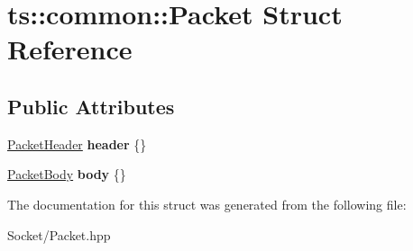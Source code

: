 \hypertarget{structts_1_1common_1_1_packet}{}\section{ts\+:\+:common\+:\+:Packet Struct Reference}
\label{structts_1_1common_1_1_packet}
\subsection*{Public Attributes}
\begin{DoxyCompactItemize}
\item 
\mbox{\label{structts_1_1common_1_1_packet_a22cf5cbe00488c2f324bc580b43b332b}} 
\hyperlink{structts_1_1common_1_1_packet_header}{Packet\+Header} {\bfseries header} \{\}
\item 
\mbox{\label{structts_1_1common_1_1_packet_ae1df6eb6a4d7307e68369a144a0c6a51}} 
\hyperlink{structts_1_1common_1_1_packet_body}{Packet\+Body} {\bfseries body} \{\}
\end{DoxyCompactItemize}


The documentation for this struct was generated from the following file\+:\begin{DoxyCompactItemize}
\item 
Socket/Packet.\+hpp\end{DoxyCompactItemize}

